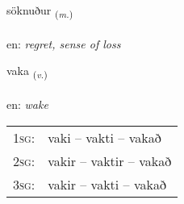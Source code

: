 \documentclass[frontgrid, backgrid]{flacards}\usepackage[]{graphicx}\usepackage[]{xcolor}
\begin{document}
\renewcommand{\flhead}{\vskip5pt \fboxsep=0pt {\small\bfseries\footnotesize Nafnorð | Noun}}
\renewcommand{\fcfoot}{\vskip5pt \fboxsep=0pt \hspace{2pt}{\small\bfseries\footnotesize 3K}}

\renewcommand{\blhead}{\vskip5pt {\small\bfseries\footnotesize Nafnorð | Noun }}
\renewcommand{\bcfoot}{\vskip5pt \hspace{2pt}{\small\bfseries\footnotesize 3K}}


{söknuður \small{\textsubscript{(\textit{m.})}} \\[1ex] %
\textphonetic{[sœhknʏðʏr]} \\
en: \emph{regret, sense of loss} \\  [2ex]
\renewcommand*{\arraystretch}{0.8}
}

\renewcommand{\flhead}{\vskip5pt \fboxsep=0pt {\small\bfseries\footnotesize Sagnorð | Verb}}
\renewcommand{\fcfoot}{\vskip5pt \fboxsep=0pt \hspace{2pt}{\small\bfseries\footnotesize 3K}}

\renewcommand{\blhead}{\vskip5pt {\small\bfseries\footnotesize Sagnorð | Verb }}
\renewcommand{\bcfoot}{\vskip5pt \hspace{2pt}{\small\bfseries\footnotesize 3K}}


{vaka \small{\textsubscript{(\textit{v.})}} \\[1ex] %
\textphonetic{[vaːka]} \\
en: \emph{wake} \\  [2ex]
\renewcommand*{\arraystretch}{0.8}
\begin{tabular}{p{1cm}l}
\textsc{1sg}: & vaki -- vakti -- vakað \\ 
\textsc{2sg}: & vakir -- vaktir -- vakað \\ 
\textsc{3sg}: & vakir -- vakti -- vakað \\ 
\end{tabular}
}
\end{document}
